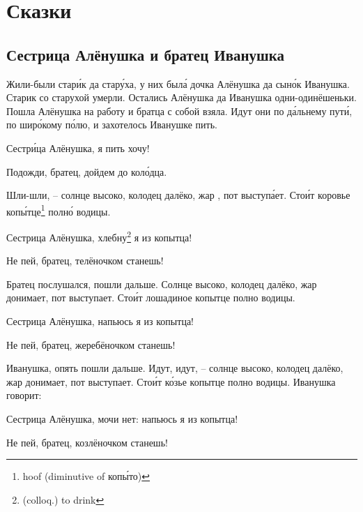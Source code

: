 \chapter{Сказки}
\section{Сестрица Алёнушка и братец Иванушка}
Жили-были стар\'{и}к да стар\'{у}ха, у них был\'{а} дочка Алёнушка да сын\'{о}к Иванушка. Старик со старухой умерли. Остались Алёнушка да Иванушка одни-одинёшеньки. Пошла Алёнушка на работу и братца с собой взяла. Идут они по д\'{а}льнему пут\'{и}, по шир\'{о}кому п\'{о}лю, и захотелось Иванушке пить.
%
\begin{dialogue}
    \item Сестр\'{и}ца Алёнушка, я пить хочу!
    \item Подожди, братец, дойдем до кол\'{о}дца.
\end{dialogue}
%
Шли-шли, -- солнце высоко, колодец далёко, жар , пот выступ\'{а}ет. Сто\'{и}т коровье коп\'{ы}тце\footnote{hoof (diminutive of коп\'{ы}то)} полн\'{о} водицы.
%
\begin{dialogue}
    \item Сестрица Алёнушка, хлебну\footnote{(colloq.) to drink} я из копытца!
    \item Не пей, братец, телёночком станешь!
\end{dialogue}
%
Братец послушался, пошли дальше. Солнце высоко, колодец далёко, жар донимает, пот выступает. Сто\'{и}т лошадиное копытце полно водицы.
%
\begin{dialogue}
    \item Сестрица Алёнушка, напьюсь я из копытца!
    \item Не пей, братец, жеребёночком станешь!
\end{dialogue}
%
 Иванушка, опять пошли дальше. Идут, идут, -- солнце высоко, колодец далёко, жар донимает, пот выступает. Сто\'{и}т к\'{о}зье копытце полно водицы. Иванушка говорит:
%
\begin{dialogue}
    \item  Сестрица Алёнушка, мочи нет: напьюсь я из копытца!
    \item  Не пей, братец, козлёночком станешь!
\end{dialogue}
